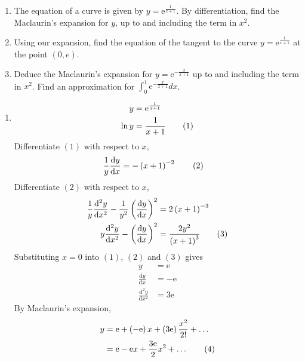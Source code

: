 \documentclass[11pt,a4paper]{book}
\begin{document}
\begin{example}

\begin{enumerate}[label=(\alph*)]

\item The equation of a curve is given by $y=\mathrm{e}^{\frac{1}{x+1}}$.
By differentiation, find the Maclaurin's expansion for $y$, up to
and including the term in $x^{2}$.

\item Using our expansion, find the equation of the tangent to the
curve $y=\mathrm{e}^{\frac{1}{x+1}}$ at the point $\left(0,e\right)$.

\item Deduce the Maclaurin's expansion for $y=\mathrm{e}^{-\frac{x}{x+1}}$
up to and including the term in $x^{2}$. Find an approximation for
${\displaystyle \int_{0}^{1}\mathrm{e}^{-\frac{x}{x+1}}dx}$.

\end{enumerate}

\Solution

\begin{enumerate}[label=(\alph*)]

\item
\begin{align*}
y & =\mathrm{e}^{\frac{1}{x+1}}\\
\ln y & =\frac{1}{x+1}\tag{{1}}
\end{align*}
Differentiate $\left(1\right)$ with respect to $x$,
\begin{align*}
\frac{1}{y}\frac{\mathrm{d}y}{\mathrm{d}x} & =-\left(x+1\right)^{-2}\tag{{2}}
\end{align*}
Differentiate $\left(2\right)$ with respect to $x$,
\begin{align*}
\frac{1}{y}\frac{\mathrm{d}^{2}y}{\mathrm{d}x^{2}}-\frac{1}{y^{2}}\left(\frac{\mathrm{d}y}{\mathrm{d}x}\right)^{2} & =2\left(x+1\right)^{-3}\\
y\frac{\mathrm{d}^{2}y}{\mathrm{d}x^{2}}-\left(\frac{\mathrm{d}y}{\mathrm{d}x}\right)^{2} & =\frac{2y^{2}}{\left(x+1\right)^{3}}\tag{{3}}
\end{align*}
Substituting $x=0$ into $\left(1\right)$, $\left(2\right)$ and
$\left(3\right)$ gives
\begin{align*}
y & =\mathrm{e}\\
\frac{\mathrm{d}y}{\mathrm{d}x} & =-\mathrm{e}\\
\frac{\mathrm{d}^{2}y}{\mathrm{d}x^{2}} & =3\mathrm{e}
\end{align*}
By Maclaurin's expansion,
\begin{align*}
y & =\mathrm{e}+\left(-\mathrm{e}\right)x+\left(3\mathrm{e}\right)\frac{x^{2}}{2!}+\ldots\\
 & =\mathrm{e}-\mathrm{e}x+\frac{3\mathrm{e}}{2}x^{2}+\ldots\tag{{4}}
\end{align*}


\end{enumerate}
\end{example}
\end{document}
